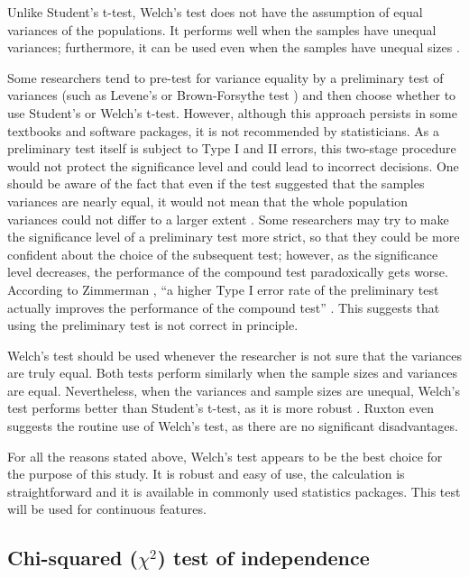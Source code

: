 Unlike Student's t-test, Welch's test does not have the assumption of equal variances of the populations. It performs well when the samples have unequal variances; furthermore, it can be used even when the samples have unequal sizes \cite{derrick}.

Some researchers tend to pre-test for variance equality by a preliminary test of variances (such as Levene's \cite{levene} or Brown-Forsythe test \cite{brown}) and then choose whether to use Student's or Welch's t-test. However, although this approach persists in some textbooks and software packages, it is not recommended by statisticians. As a preliminary test itself is subject to Type I and II errors, this two-stage procedure would not protect the significance level and could lead to incorrect decisions. One should be aware of the fact that even if the test suggested that the samples variances are nearly equal, it would not mean that the whole population variances could not differ to a larger extent \cite{zimmerman}. Some researchers may try to make the significance level of a preliminary test more strict, so that they could be more confident about the choice of the subsequent test; however, as the significance level decreases, the performance of the compound test paradoxically gets worse. According to Zimmerman \cite{zimmerman}, ``a higher Type I error rate of the preliminary test actually improves the performance of the compound test'' \cite{zimmerman}. This suggests that using the preliminary test is not correct in principle.

Welch's test should be used whenever the researcher is not sure that the variances are truly equal. Both tests perform similarly when the sample sizes and variances are equal. Nevertheless, when the variances and sample sizes are unequal, Welch's test performs better than Student's t-test, as it is more robust \cite{derrick}. Ruxton \cite{ruxton} even suggests the routine use of Welch's test, as there are no significant disadvantages. 

For all the reasons stated above, Welch's test appears to be the best choice for the purpose of this study. It is robust and easy of use, the calculation is straightforward and it is available in commonly used statistics packages. This test will be used for continuous features.

\subsection{Chi-squared ($\chi^{2}$) test of independence}

